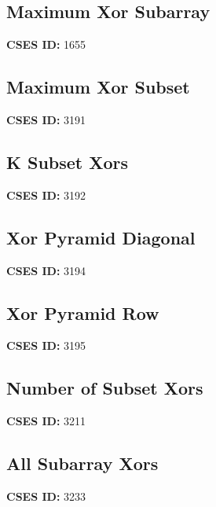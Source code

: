\documentclass[10pt, a4paper, twocolumn, landscape]{article}
\begin{document}
\subsection{Maximum Xor Subarray}
\textbf{CSES ID:} 1655 \\

\vspace{0.2cm}
\subsection{Maximum Xor Subset}
\textbf{CSES ID:} 3191 \\

\vspace{0.2cm}
\subsection{K Subset Xors}
\textbf{CSES ID:} 3192 \\

\vspace{0.2cm}
\subsection{Xor Pyramid Diagonal}
\textbf{CSES ID:} 3194 \\

\vspace{0.2cm}
\subsection{Xor Pyramid Row}
\textbf{CSES ID:} 3195 \\

\vspace{0.2cm}
\subsection{Number of Subset Xors}
\textbf{CSES ID:} 3211 \\

\vspace{0.2cm}
\subsection{All Subarray Xors}
\textbf{CSES ID:} 3233 \\

\vspace{0.2cm}
\end{document}
